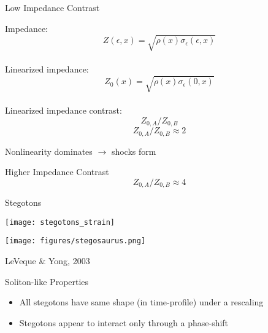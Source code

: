 \documentclass[xcolor=pst,dvipsnames]{beamer}
\begin{document}
\begin{frame}{Low Impedance Contrast}

Impedance: $$Z(\epsilon,x) = \sqrt{\rho(x)\sigma_\epsilon(\epsilon,x)}$$ \\ \pause
Linearized impedance: $$Z_0(x) = \sqrt{\rho(x)\sigma_\epsilon(0,x)}$$ \\ \pause
Linearized impedance contrast: $$Z_{0,A}/Z_{0,B}$$ \pause
$$Z_{0,A}/Z_{0,B} \approx 2$$

\begin{center} \end{center} \pause

\begin{center} Nonlinearity dominates $\to$ shocks form\end{center}
\end{frame}


\begin{frame}{Higher Impedance Contrast}
$$Z_{0,A}/Z_{0,B} \approx 4 $$

\begin{center}  \end{center}

\begin{center}  \end{center}

\end{frame}


\begin{frame}{Stegotons}
  \begin{center}      \texttt{[image: stegotons\_strain]} \end{center} \pause
  \vspace{-1cm}
  \begin{center} \texttt{[image: figures/stegosaurus.png]} \end{center}
  LeVeque \& Yong, 2003
\end{frame}

\begin{frame}{Soliton-like Properties}
  \begin{itemize}
    \item All stegotons have same shape (in time-profile) under a
            rescaling
    \item Stegotons appear to interact only through a phase-shift
  \end{itemize}
\begin{center}  \end{center}
\begin{center}  \end{center}
\end{frame}
\end{document}
